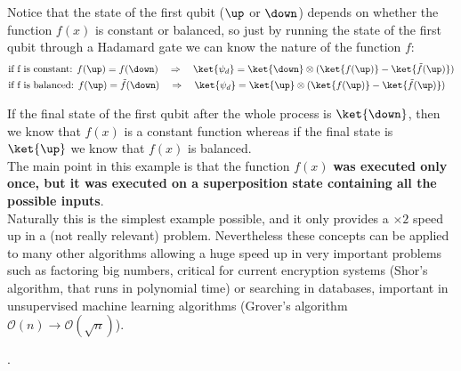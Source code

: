 Notice that the state of the first qubit ($\up$ or $\down$) depends on whether the function $f(x)$ is constant or balanced, so just by running the state of the first qubit through a Hadamard gate we can know the nature of the function $f$:
\begin{equation}
  \begin{split}
    &\text{if f is constant:   }f(\up)=f(\down)\quad\Rightarrow\quad
    \ket{\psi_d}= \ket{\down}\otimes(\ket{f(\up)}-\ket{\tilde{f}(\up)})\\
    &\text{if f is balanced:   } f(\up)=\tilde{f}(\down)\quad\Rightarrow\quad
    \ket{\psi_d}= \ket{\up}\otimes(\ket{f(\up)}-\ket{\tilde{f}(\up)})
  \end{split}
\end{equation}

If the final state of the first qubit after the whole process is $\ket{\down}$, then we know that $f(x)$ is a constant function whereas if the final state is $\ket{\up}$ we know that $f(x)$ is balanced.\\

The main point in this example is that the function $f(x)$ \textbf{was executed only once, but it was executed on a superposition state containing all the possible inputs}.\\

Naturally this is the simplest example possible, and it only provides a $\times2$ speed up in a (not really relevant) problem. Nevertheless these concepts can be applied to many other algorithms allowing a huge speed up in very important problems such as factoring big numbers, critical for current encryption systems (Shor's algorithm, that runs in polynomial time) or searching in databases, important in unsupervised machine learning algorithms (Grover's algorithm $\mathcal{O}(n)\rightarrow\mathcal{O}(\sqrt{n})$).

.

